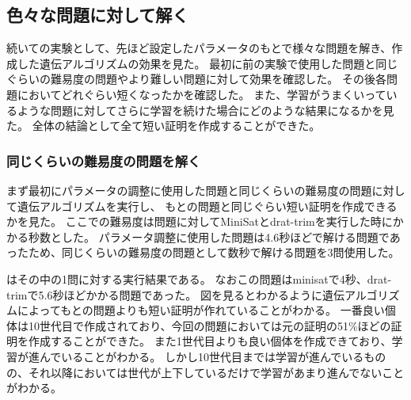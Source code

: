 







\subsection{色々な問題に対して解く}%



続いての実験として、先ほど設定したパラメータのもとで様々な問題を解き、作成した遺伝アルゴリズムの効果を見た。
最初に前の実験で使用した問題と同じぐらいの難易度の問題やより難しい問題に対して効果を確認した。
その後各問題においてどれぐらい短くなったかを確認した。
また、学習がうまくいっているような問題に対してさらに学習を続けた場合にどのような結果になるかを見た。
全体の結論として全て短い証明を作成することができた。



\subsubsection{同じくらいの難易度の問題を解く}

まず最初にパラメータの調整に使用した問題と同じくらいの難易度の問題に対して遺伝アルゴリズムを実行し、
もとの問題と同じぐらい短い証明を作成できるかを見た。
ここでの難易度は問題に対してMiniSatとdrat-trimを実行した時にかかる秒数とした。
パラメータ調整に使用した問題は4.6秒ほどで解ける問題であったため、同じくらいの難易度の問題として数秒で解ける問題を3問使用した。


はその中の1問に対する実行結果である。
なおこの問題はminisatで4秒、drat-trimで5.6秒ほどかかる問題であった。
図を見るとわかるように遺伝アルゴリズムによってもとの問題よりも短い証明が作れていることがわかる。
一番良い個体は10世代目で作成されており、今回の問題においては元の証明の51\%ほどの証明を作成することができた。
また1世代目よりも良い個体を作成できており、学習が進んでいることがわかる。
しかし10世代目までは学習が進んでいるものの、それ以降においては世代が上下しているだけで学習があまり進んでないことがわかる。



